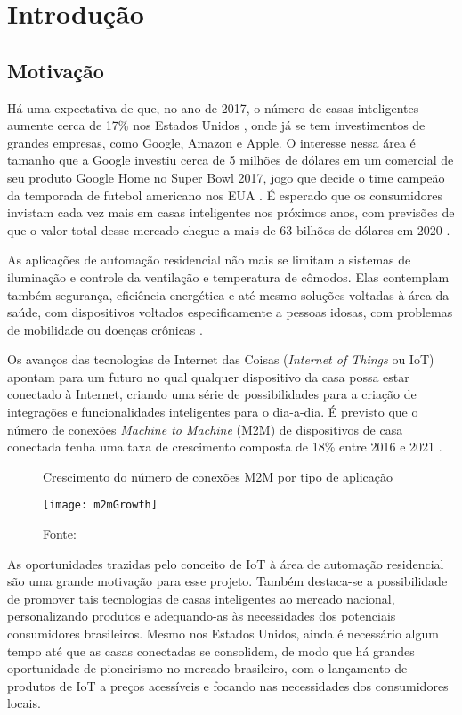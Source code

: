 \chapter{Introdução}

\section{Motivação}
Há uma expectativa de que, no ano de 2017, o número de casas inteligentes aumente cerca de 17\% nos Estados Unidos \cite{mckinseyReport}, onde já se tem investimentos de grandes empresas, como Google, Amazon e Apple. O interesse nessa área é tamanho que a Google investiu cerca de 5 milhões de dólares em um comercial de seu produto Google Home no Super Bowl 2017, jogo que decide o time campeão da temporada de futebol americano nos EUA \cite{kennemer}. É esperado que os consumidores invistam cada vez mais em casas inteligentes nos próximos anos, com previsões de que o valor total desse mercado chegue a mais de 63 bilhões de dólares em 2020 \cite{businessWire}.

As aplicações de automação residencial não mais se limitam a sistemas de iluminação e controle da ventilação e temperatura de cômodos. Elas contemplam também segurança, eficiência energética e até mesmo soluções voltadas à área da saúde, com dispositivos voltados especificamente a pessoas idosas, com problemas de mobilidade ou doenças crônicas \cite{iscoop}.

Os avanços das tecnologias de Internet das Coisas (\textit{Internet of Things} ou IoT) apontam para um futuro no qual qualquer dispositivo da casa possa estar conectado à Internet, criando uma série de possibilidades para a criação de integrações e funcionalidades inteligentes para o dia-a-dia. É previsto que o número de conexões \textit{Machine to Machine} (M2M) de dispositivos de casa conectada tenha uma taxa de crescimento composta de 18\% entre 2016 e 2021 \cite{ciscoReport}.

\begin{figure}[H]
	\centering
	\caption{Crescimento do número de conexões M2M por tipo de aplicação}
  \texttt{[image: m2mGrowth]}
	\caption*{Fonte: \cite{ciscoReport}}
\label{fig:m2mGrowth}
\end{figure}

As oportunidades trazidas pelo conceito de IoT à área de automação residencial são uma grande motivação para esse projeto. Também destaca-se a possibilidade de promover tais tecnologias de casas inteligentes ao mercado nacional, personalizando produtos e adequando-as às necessidades dos potenciais consumidores brasileiros. Mesmo nos Estados Unidos, ainda é necessário algum tempo até que as casas conectadas se consolidem, de modo que há grandes oportunidade de pioneirismo no mercado brasileiro, com o lançamento de produtos de IoT a preços acessíveis e focando nas necessidades dos consumidores locais.

